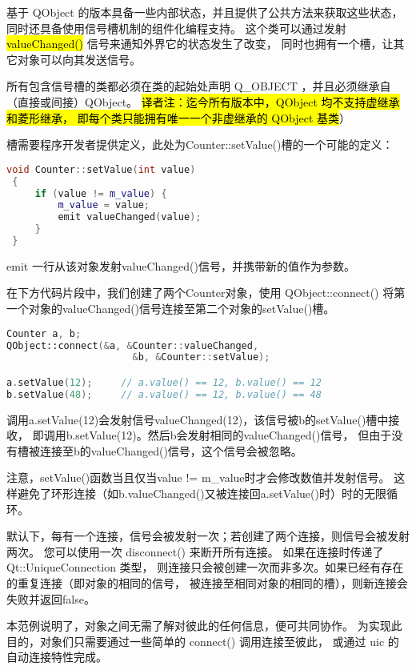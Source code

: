 基于 QObject 的版本具备一些内部状态，并且提供了公共方法来获取这些状态，
同时还具备使用信号槽机制的组件化编程支持。
这个类可以通过发射 \hl{valueChanged()} 信号来通知外界它的状态发生了改变，
同时也拥有一个槽，让其它对象可以向其发送信号。

所有包含信号槽的类都必须在类的起始处声明 Q\_OBJECT ，并且必须继承自（直接或间接）QObject。
\hl{译者注：迄今所有版本中，QObject 均不支持虚继承和菱形继承，
即每个类只能拥有唯一一个非虚继承的 QObject 基类}）

槽需要程序开发者提供定义，此处为Counter::setValue()槽的一个可能的定义：

\begin{lstlisting}[language=C++]
void Counter::setValue(int value)
 {
     if (value != m_value) {
         m_value = value;
         emit valueChanged(value);
     }
 }
\end{lstlisting}

emit 一行从该对象发射valueChanged()信号，并携带新的值作为参数。

在下方代码片段中，我们创建了两个Counter对象，使用 QObject::connect() 
将第一个对象的valueChanged()信号连接至第二个对象的setValue()槽。

\begin{lstlisting}[language=C++]
Counter a, b;
QObject::connect(&a, &Counter::valueChanged,
                      &b, &Counter::setValue);

a.setValue(12);     // a.value() == 12, b.value() == 12
b.setValue(48);     // a.value() == 12, b.value() == 48
\end{lstlisting}

调用a.setValue(12)会发射信号valueChanged(12)，该信号被b的setValue()槽中接收，
即调用b.setValue(12)。然后b会发射相同的valueChanged()信号，
但由于没有槽被连接至b的valueChanged()信号，这个信号会被忽略。

注意，setValue()函数当且仅当value != m\_value时才会修改数值并发射信号。
这样避免了环形连接（如b.valueChanged()又被连接回a.setValue()时）时的无限循环。

默认下，每有一个连接，信号会被发射一次；若创建了两个连接，则信号会被发射两次。
您可以使用一次 disconnect() 来断开所有连接。
如果在连接时传递了 Qt::UniqueConnection 类型，
则连接只会被创建一次而非多次。如果已经有存在的重复连接（即对象的相同的信号，
被连接至相同对象的相同的槽），则新连接会失败并返回false。

本范例说明了，对象之间无需了解对彼此的任何信息，便可共同协作。
为实现此目的，对象们只需要通过一些简单的 connect() 调用连接至彼此，
或通过 uic 的自动连接特性完成。

